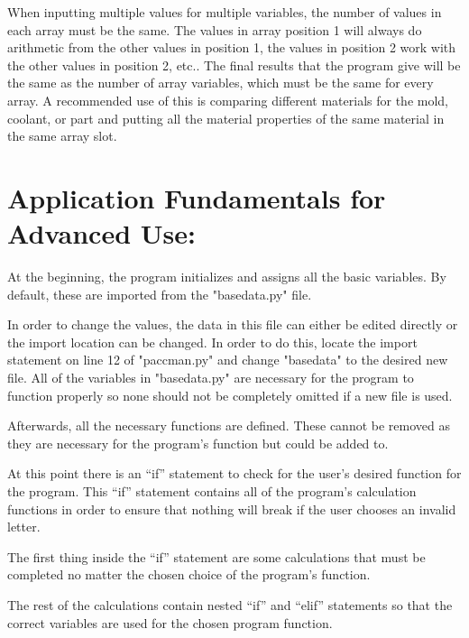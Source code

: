 \documentclass[a4paper,12pt]{article}
\begin{document}
When inputting multiple values for multiple variables, the number of values in each array must be the same. The values in array position 1 will always do arithmetic from the other values in position 1, the values in position 2 work with the other values in position 2, etc.. The final results that the program give will be the same as the number of array variables, which must be the same for every array. A recommended use of this is  comparing different materials for the mold, coolant, or part and putting all the material properties of the same material in the same array slot.

\clearpage

\section*{Application Fundamentals for Advanced Use:}

At the beginning, the program initializes and assigns all the basic variables. By default, these are imported from the "basedata.py" file. 

\medskip

In order to change the values, the data in this file can either be edited directly or the import location can be changed. In order to do this, locate the import statement on line 12 of "paccman.py" and change "basedata" to the desired new file. All of the variables in "basedata.py" are necessary for the program to function properly so none should not be completely omitted if a new file is used.

\medskip

Afterwards, all the necessary functions are defined. These cannot be removed as they are necessary for the program’s function but could be added to.

\medskip

At this point there is an “if” statement to check for the user’s desired function for the program.  This “if” statement contains all of the program’s calculation functions in order to ensure that nothing will break if the user chooses an invalid letter.

\medskip

The first thing inside the “if” statement are some calculations that must be completed no matter the chosen choice of the program’s function. 

\medskip

The rest of the calculations contain nested “if” and “elif” statements so that the correct variables are used for the chosen program function.
\end{document}
